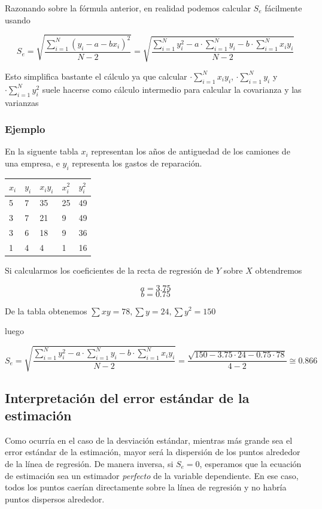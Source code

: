 \documentclass[]{book}
\theoremstyle{plain}
\theoremstyle{definition}
\begin{document}
Razonando sobre la fórmula anterior, en realidad podemos calcular
\(S_e\) fácilmente usando

\[S_e =  \sqrt{\frac{\sum^N_{i=1} (y_i - a - bx_i)^2 }{N-2}} =\sqrt{\frac{\sum^N_{i=1} y_i^2 - a \cdot \sum^N_{i=1} y_i - b\cdot \sum^N_{i=1} x_i y_i }{N-2}} \]

Esto simplifica bastante el cálculo ya que calcular
\(\cdot \sum^N_{i=1} x_i y_i\), \(\cdot \sum^N_{i=1} y_i\) y
\(\cdot \sum^N_{i=1} y_i^2\) suele hacerse como cálculo intermedio para
calcular la covarianza y las varianzas

\hypertarget{ejemplo-3}{%
\subsubsection{Ejemplo}\label{ejemplo-3}}

En la siguente tabla \(x_i\) representan los años de antiguedad de los
camiones de una empresa, e \(y_i\) representa los gastos de reparación.

\begin{longtable}[]{@{}lllll@{}}
\toprule
\(x_i\) & \(y_i\) & \(x_iy_i\) & \(x_i^2\) & \(y_i^2\)\tabularnewline
\midrule
\endhead
5 & 7 & 35 & 25 & 49\tabularnewline
3 & 7 & 21 & 9 & 49\tabularnewline
3 & 6 & 18 & 9 & 36\tabularnewline
1 & 4 & 4 & 1 & 16\tabularnewline
\bottomrule
\end{longtable}

Si calcularmos los coeficientes de la recta de regresión de \(Y\) sobre
\(X\) obtendremos

\[a=3.75\] \[b=0.75\]

De la tabla obtenemos \(\sum xy = 78, \sum y = 24, \sum y^2 = 150\)

luego

\[S_e = \sqrt{\frac{\sum^N_{i=1} y_i^2 - a \cdot \sum^N_{i=1} y_i - b\cdot \sum^N_{i=1} x_i y_i }{N-2}} = \frac{ \sqrt{150 - 3.75 \cdot24 - 0.75 \cdot 78}}{4-2} \cong 0.866\]

\hypertarget{interpretaciuxf3n-del-error-estuxe1ndar-de-la-estimaciuxf3n}{%
\subsection{Interpretación del error estándar de la
estimación}\label{interpretaciuxf3n-del-error-estuxe1ndar-de-la-estimaciuxf3n}}

Como ocurría en el caso de la desviación estándar, mientras más grande
sea el error estándar de la estimación, mayor será la dispersión de los
puntos alrededor de la línea de regresión. De manera inversa, si
\(S_e=0\), esperamos que la ecuación de estimación sea un estimador
\emph{perfecto} de la variable dependiente. En ese caso, todos los
puntos caerían directamente sobre la línea de regresión y no habría
puntos dispersos alrededor.
\end{document}
